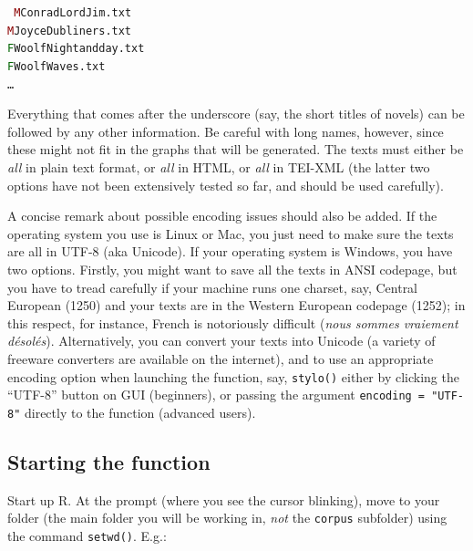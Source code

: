 \documentclass[11pt,a4paper]{article}
\def\underscore{\raisebox{-.8ex}{-}}
\def\code#1{{\tt #1}}
\begin{document}
\medskip

\code{
\noindent
\textcolor{darkred}{M}\underscore Conrad\underscore Lord\underscore Jim.txt \\
\textcolor{darkred}{M}\underscore Joyce\underscore Dubliners.txt \\
\textcolor{darkgreen}{F}\underscore Woolf\underscore Night\underscore and\underscore day.txt \\
\textcolor{darkgreen}{F}\underscore Woolf\underscore Waves.txt \\
\dots
}

\medskip


Everything that comes after the underscore (say, the short titles
of novels) can be followed by any other information. Be careful with
long names, however, since these might not fit in the graphs that
will be generated. The texts must either be \textit{all} in plain
text format, or \textit{all} in HTML, or \textit{all} in TEI-XML (the
latter two options have not been extensively tested so far, and should
be used carefully). 

A concise remark about possible encoding issues should also be added. 
If the operating system you use is Linux or Mac, you just need to make 
sure the texts are all in UTF-8 (aka Unicode). If your operating system 
is Windows, you have two options. Firstly, you might want to save all 
the texts in ANSI codepage, but you have to tread carefully if your 
machine runs one charset, say, Central European (1250) and your texts 
are in the Western European codepage (1252); in this respect, for 
instance, French is notoriously difficult (\emph{nous sommes vraiement 
désolés}). Alternatively, you can convert your texts into Unicode 
(a variety of freeware converters are available on the internet), 
and to use an appropriate encoding option when launching the function, 
say, \code{stylo()} either by clicking the ``UTF-8'' button on GUI 
(beginners), or passing the argument \code{encoding = "UTF-8"} directly 
to the function (advanced users).



\subsection{Starting the function}

Start up R. At the prompt (where you see the cursor blinking), move
to your folder (the main folder you will be working in, \textit{not}
the \code{corpus} subfolder) using the command \code{setwd()}.
E.g.:
\end{document}
